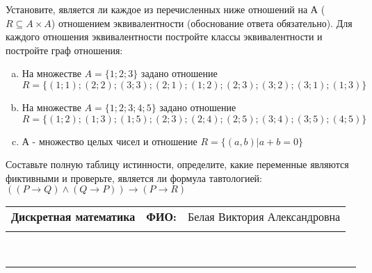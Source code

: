 \documentclass[10pt]{exam}
\newcommand{\class}{Дискретная математика}
\newcommand{\examdate}{}
\begin{document}
\begin{questions}
\question
Установите, является ли каждое из перечисленных ниже отношений на А ($R \subseteq A \times A$) отношением эквивалентности (обоснование ответа обязательно). Для каждого отношения эквивалентности постройте классы 
эквивалентности и постройте граф отношения:
\begin{enumerate} [a)]\setcounter{enumi}{0}
\item На множестве $A = \{1; 2; 3\}$ задано отношение $R = \{(1; 1); (2; 2); (3; 3); (2; 1); (1; 2); (2; 3); (3; 2); (3; 1); (1; 3)\}$
\item На множестве $A = \{1; 2; 3; 4; 5\}$ задано отношение $R = \{(1; 2); (1; 3); (1; 5); (2; 3); (2; 4); (2; 5); (3; 4); (3; 5); (4; 5)\}$
\item А - множество целых чисел и отношение $R = \{(a,b)|a + b = 0\}$
\end{enumerate}\question Составьте полную таблицу истинности, определите, какие переменные являются фиктивными и проверьте, является ли формула тавтологией:
$(( P \rightarrow Q) \land (Q \rightarrow P)) \rightarrow (P \rightarrow R)$

\end{questions}
\newpage
\begin{flushright}
\begin{tabular}{p{2.8in} r l}
\textbf{\class} & \textbf{ФИО:} &Белая Виктория Александровна
\\

\textbf{\examdate} &&\\
\end{tabular}\\
\end{flushright}
\rule[1ex]{\textwidth}{.1pt}
\end{document}
